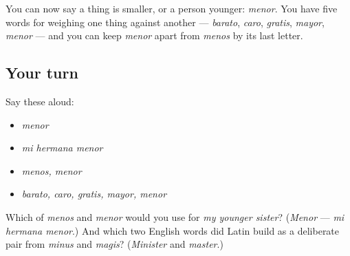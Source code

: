 \begin{grammarlens}[title={What you've built}]
You can now say a thing is smaller, or a person younger: \emph{menor}. You have five words for weighing one thing against another — \emph{barato}, \emph{caro}, \emph{gratis}, \emph{mayor}, \emph{menor} — and you can keep \emph{menor} apart from \emph{menos} by its last letter.
\end{grammarlens}

\subsection*{Your turn}
Say these aloud:

\begin{itemize}
\raggedright
  \item \emph{menor}
  \item \emph{mi hermana menor}
  \item \emph{menos, menor}
  \item \emph{barato, caro, gratis, mayor, menor}
\end{itemize}

\begin{tcolorbox}[breakable,colback=teal!4,colframe=teal!35!black,title={Before you move on}]
Which of \emph{menos} and \emph{menor} would you use for \emph{my younger sister}? (\emph{Menor} — \emph{mi hermana menor}.) And which two English words did Latin build as a deliberate pair from \emph{minus} and \emph{magis}? (\emph{Minister} and \emph{master}.)
\end{tcolorbox}

